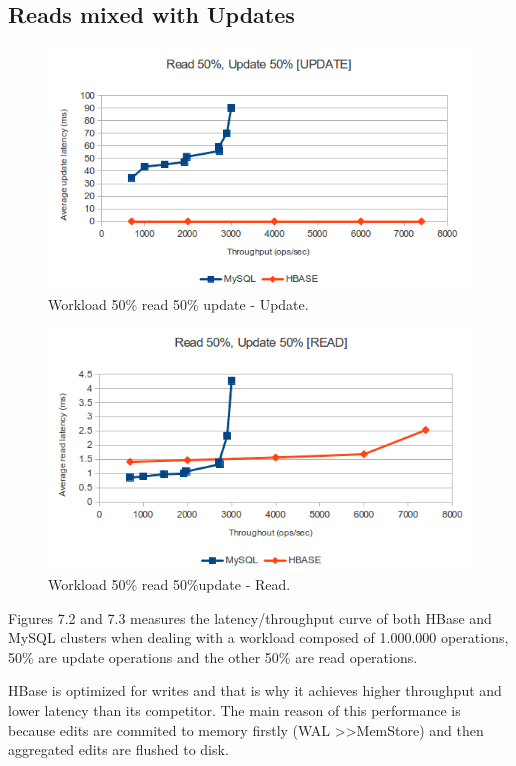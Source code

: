 \subsection{Reads mixed with Updates}


\begin{figure}[htb]
\centering
\includegraphics[width=1\textwidth]{./images/workloadAUpdate1.png}
\caption{Workload 50\% read 50\% update - Update.}
\label{fig:AUpdate}
\end{figure}

\begin{figure}[htb]
\centering
\includegraphics[width=1\textwidth]{./images/workloadARead1.png}
\caption{Workload 50\% read 50\%update - Read.}
 \label{fig:ARead}
\end{figure}

Figures 7.2 and 7.3 measures the latency/throughput curve of both HBase and MySQL clusters when dealing with a workload composed of 1.000.000 operations, 50\% are update operations and the other 50\% are read operations.
\par
HBase is optimized for writes and that is why it achieves higher throughput and lower latency than its competitor. The main reason of this performance is because edits are commited to memory firstly (WAL \textgreater\textgreater MemStore) and then aggregated edits are flushed to disk.


